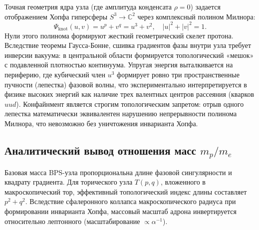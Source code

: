 \documentclass[11pt,a4paper]{article}
\begin{document}
Точная геометрия ядра узла (где амплитуда конденсата $\rho = 0$) задается отображением Хопфа гиперсферы $S^3 \to \mathbb{C}^2$ через комплексный полином Милнора:
\begin{equation}
\Psi_{\text{knot}}(u, v) = u^p + v^q = u^3 + v^2, \quad |u|^2 + |v|^2 = 1.
\end{equation}
Нули этого полинома формируют жесткий геометрический скелет протона. Вследствие теоремы Гаусса-Бонне, сшивка градиентов фазы внутри узла требует инверсии вакуума: в центральной области формируется топологический «мешок» с подавленной плотностью континуума. Упругая энергия выталкивается на периферию, где кубический член $u^3$ формирует ровно три пространственные пучности (лепестка) фазовой волны, что экспериментально интерпретируется в физике высоких энергий как наличие трех валентных центров рассеяния (кварков $uud$). Конфайнмент является строгим топологическим запретом: отрыв одного лепестка математически эквивалентен нарушению непрерывности полинома Милнора, что невозможно без уничтожения инварианта Хопфа.

\subsection{Аналитический вывод отношения масс $m_p/m_e$}
Базовая масса BPS-узла пропорциональна длине фазовой сингулярности и квадрату градиента. Для торического узла $T(p,q)$, вложенного в макроскопический тор, эффективный топологический индекс длины составляет $p^2 + q^2$. Вследствие сфалеронного коллапса макроскопического радиуса при формировании инварианта Хопфа, массовый масштаб адрона инвертируется относительно лептонного (масштабирование $\propto \alpha^{-1}$).
\end{document}
